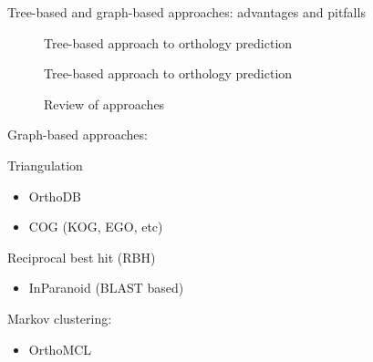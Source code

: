 Tree-based and graph-based approaches: advantages and pitfalls

\begin{description}
	\item[\cite{mirkin1995}] Tree-based approach to orthology prediction
	\item[\cite{yuan1998}] Tree-based approach to orthology prediction
	\item[\cite{kuzniar2008}] Review of approaches
\end{description}

Graph-based approaches:

Triangulation

\begin{itemize}
	\item OrthoDB 
	\item COG (KOG, EGO, etc)
\end{itemize}

Reciprocal best hit (RBH) 

\begin{itemize}
	\item InParanoid (BLAST based)
\end{itemize}

Markov clustering:

\begin{itemize}
	\item OrthoMCL
\end{itemize}


